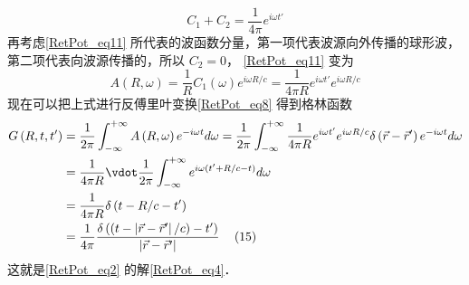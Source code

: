 \begin{equation}
{C_1} + {C_2} = \frac{1}{{4\pi }}{e^{i\omega t'}}
\end{equation} 
再考虑\autoref{RetPot_eq11} 所代表的波函数分量，第一项代表波源向外传播的球形波，第二项代表向波源传播的，所以 ${C_2} = 0$， \autoref{RetPot_eq11} 变为
\begin{equation}
A\left( {R,\omega } \right) = \frac{1}{R}{C_1}\left( \omega  \right){e^{i\omega R/c}} = \frac{1}{{4\pi R}}{e^{i\omega t'}}{e^{i\omega R/c}}
\end{equation} 
现在可以把上式进行反傅里叶变换\autoref{RetPot_eq8} 得到格林函数
\begin{equation}
\begin{aligned}
G\left( {R,t,t'} \right) &= \frac{1}{{2\pi }}\int_{ - \infty }^{ + \infty } {A\left( {R,\omega } \right){e^{ - i\omega t}}d\omega }  = \frac{1}{{2\pi }}\int_{ - \infty }^{ + \infty } {\frac{1}{{4\pi R}}{e^{i\omega t'}}{e^{i\omega R/c}}\delta \left( {\vec r - \vec r'} \right){e^{ - i\omega t}}d\omega } \\
&= \frac{1}{{4\pi R}} \vdot \frac{1}{{2\pi }}\int_{ - \infty }^{ + \infty } {{e^{i\omega (t' + R/c - t)}}d\omega } \\
&= \frac{1}{{4\pi R}}\delta \left( {t - R/c - t'} \right)\\
&= \frac{1}{{4\pi }}\frac{{\delta \left( {\left( {t - \left| {\vec r - \vec r'} \right|/c} \right) - t'} \right)}}{{\left| {\vec r - \vec r'} \right|}}{\kern 1pt} {\kern 1pt} {\kern 1pt} {\kern 1pt} {\kern 1pt} {\kern 1pt} {\kern 1pt} {\kern 1pt} {\kern 1pt} {\kern 1pt} {\kern 1pt} {\kern 1pt} (15)
\end{aligned}
\end{equation} 
这就是\autoref{RetPot_eq2} 的解\autoref{RetPot_eq4}． 


